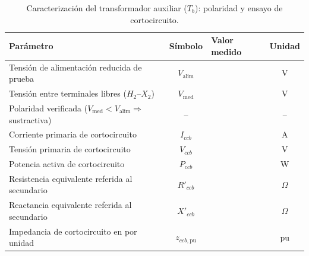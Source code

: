 \documentclass[12pt]{article}
\begin{document}
\renewcommand{\tablename}{Cuadro}
\setcounter{table}{1}

\begin{table}[H]
\centering
\small
\renewcommand{\arraystretch}{1.15}
\caption{Caracterizaci\'on del transformador auxiliar ($T_b$): polaridad y ensayo de cortocircuito.}
\begin{tabular}{|p{}|c|p{}|c|}
\hline
\textbf{Par\'ametro} & \textbf{S\'imbolo} & \textbf{Valor medido} & \textbf{Unidad} \\ \hline
Tensi\'on de alimentaci\'on reducida de prueba & $V_{\mathrm{alim}}$ & & V \\ \hline
Tensi\'on entre terminales libres ($H_2$--$X_2$) & $V_{\mathrm{med}}$ & & V \\ \hline
Polaridad verificada ($V_{\mathrm{med}} < V_{\mathrm{alim}} \Rightarrow$ sustractiva) & -- & & -- \\ \hline
Corriente primaria de cortocircuito & $I_{ccb}$ & & A \\ \hline
Tensi\'on primaria de cortocircuito & $V_{ccb}$ & & V \\ \hline
Potencia activa de cortocircuito & $P_{ccb}$ & & W \\ \hline
Resistencia equivalente referida al secundario & $R'_{ccb}$ & & $\Omega$ \\ \hline
Reactancia equivalente referida al secundario & $X'_{ccb}$ & & $\Omega$ \\ \hline
Impedancia de cortocircuito en por unidad & $z_{ccb,\mathrm{pu}}$ & & pu \\ \hline
\end{tabular}
\end{table}


\begin{table}[H]
\centering
\small
\renewcommand{\arraystretch}{1.2}
\caption{Registro experimental sin carga conectada}
\end{table}
\end{document}

